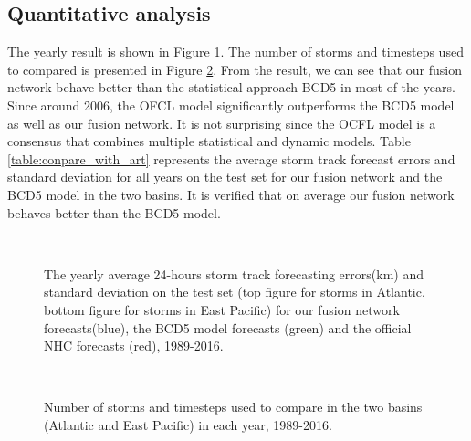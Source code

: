 \subsection{Quantitative analysis}
 The yearly result is shown in Figure \ref{fig:compare_with_art}. The number of storms and timesteps used to compared is presented in Figure \ref{fig:compare_number}. From the result, we can see that our fusion network behave better than the statistical approach BCD5 in most of the years. Since around 2006, the OFCL model significantly outperforms the BCD5 model as well as our fusion network. It is not surprising since the OCFL model is a consensus that combines multiple statistical and dynamic models. Table \ref{table:conpare_with_art} represents the average storm track forecast errors and standard deviation for all years on the test set for our fusion network and the BCD5 model in the two basins. It is verified that on average our fusion network behaves better than the BCD5 model.   
\begin{figure}
	\begin{center}
		\hsize {}\\
		\hsize
	\end{center}
	\caption{The yearly average 24-hours storm track forecasting errors(km) and standard deviation on the test set (top figure for storms in Atlantic, bottom figure for storms in East Pacific) for our fusion network forecasts(blue), the BCD5 model forecasts (green) and the official NHC forecasts (red), 1989-2016.}
	\label{fig:compare_with_art}
\end{figure}

\begin{figure}
	\begin{center}
		\hsize 
		\\
		\hsize
	\end{center}
	\caption{Number of storms and timesteps used to compare in the two basins (Atlantic and East Pacific) in each year, 1989-2016.}
	\label{fig:compare_number}
\end{figure}

